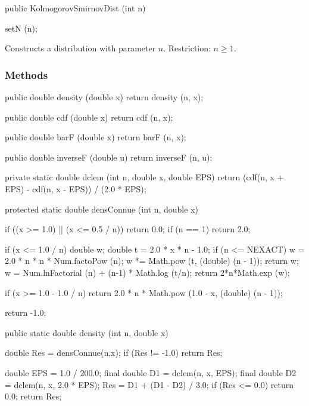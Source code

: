 \begin{code}

   public KolmogorovSmirnovDist (int n)\begin{hide} {
      setN (n);
   }\end{hide}
\end{code}
\begin{tabb}
   Constructs a \ks{} distribution with parameter $n$.
   Restriction: $n \ge 1$.
\end{tabb}

\subsubsection* {Methods}

\begin{code}\begin{hide}

   public double density (double x) {
      return density (n, x);
   }

   public double cdf (double x) {
      return cdf (n, x);
  }

   public double barF (double x) {
      return barF (n, x);
   }

   public double inverseF (double u) {
      return inverseF (n, u);
   }

   private static double dclem (int n, double x, double EPS) {
      return (cdf(n, x + EPS) - cdf(n, x - EPS)) / (2.0 * EPS);
   }

   protected static double densConnue (int n, double x) {
      if ((x >= 1.0) || (x <= 0.5 / n))
         return 0.0;
      if (n == 1)
         return 2.0;

      if (x <= 1.0 / n) {
         double w;
         double t = 2.0 * x * n - 1.0;
         if (n <= NEXACT) {
            w = 2.0 * n * n * Num.factoPow (n);
            w *= Math.pow (t, (double) (n - 1));
            return w;
         }
         w = Num.lnFactorial  (n) + (n-1) * Math.log (t/n);
         return 2*n*Math.exp (w);
      }

      if (x >= 1.0 - 1.0 / n)
         return 2.0 * n * Math.pow (1.0 - x, (double) (n - 1));

      return -1.0;
   }\end{hide}

   public static double density (int n, double x)\begin{hide} {
      double Res = densConnue(n,x);
      if (Res != -1.0)
         return Res;

      double EPS = 1.0 / 200.0;
      final double D1 = dclem(n, x, EPS);
      final double D2 = dclem(n, x, 2.0 * EPS);
      Res = D1 + (D1 - D2) / 3.0;
      if (Res <= 0.0)
         return 0.0;
      return Res;
   }\end{hide}
\end{code}
